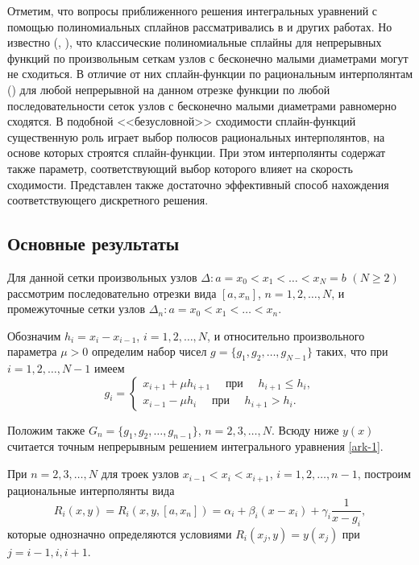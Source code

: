 Отметим, что вопросы приближенного решения интегральных уравнений с помощью полиномиальных
сплайнов рассматривались в \cite{ark-4,ark-5,ark-6,ark-7} и других работах. Но известно
(\cite{ark-7}, \cite{ark-8}), что классические полиномиальные сплайны для непрерывных функций
по произвольным сеткам узлов с бесконечно малыми диаметрами могут не сходиться.
В отличие от них сплайн-функции по рациональным интерполянтам (\cite{ark-9}) для любой непрерывной
на данном отрезке функции по любой последовательности сеток узлов с бесконечно малыми диаметрами
равномерно сходятся. В подобной <<безусловной>> сходимости сплайн-функций существенную роль
играет выбор полюсов рациональных интерполянтов, на основе которых строятся сплайн-функции.
При этом интерполянты содержат также параметр, соответствующий выбор которого
влияет на скорость сходимости. Представлен также достаточно эффективный способ нахождения
соответствующего дискретного решения.


\subsection{Основные результаты}
Для данной сетки произвольных узлов $\Delta: a=x_0<x_1<\dots <x_N=b$ $(N\geqslant 2)$
рассмотрим последовательно отрезки вида $[a,x_n]$, $n=1,2,\dots,N$, и промежуточные
сетки узлов $\Delta_n: a=x_0<x_1<\dots<x_n$.

Обозначим $h_i=x_i-x_{i-1}$, $i=1,2,\dots,N$, и относительно произвольного параметра
$\mu>0$ определим набор чисел $g=\{g_1,g_2,\dots,g_{N-1}\}$ таких, что при $i=1,2,\dots,N-1$
имеем
\begin{equation}\label{ark-eq-1.1}
g_i=\begin{cases}
x_{i+1}+\mu h_{i+1} \quad\text{ при }\quad h_{i+1}\leqslant h_i,\\
x_{i-1}-\mu h_i \quad \text{ при }\quad h_{i+1}> h_i.
\end{cases}
\end{equation}

Положим также $G_n=\{g_1,g_2,\dots,g_{n-1}\}$, $n=2,3,\dots,N$.
Всюду ниже $y(x)$ считается точным непрерывным решением интегрального уравнения \eqref{ark-1}.

При $n=2,3,\dots,N$ для троек узлов $x_{i-1}<x_i<x_{i+1}$, $i=1,2,\dots,n-1$,
построим рациональные интерполянты вида
\begin{equation}\label{ark-eq-1.2}
R_i(x,y)=R_i(x,y,[a,x_n])=\alpha_i+\beta_i(x-x_i)+\gamma_i \frac 1{x-g_i},
\end{equation}
которые однозначно определяются условиями $R_i(x_j,y)=y(x_j)$ при $j=i-1,i,i+1$.

